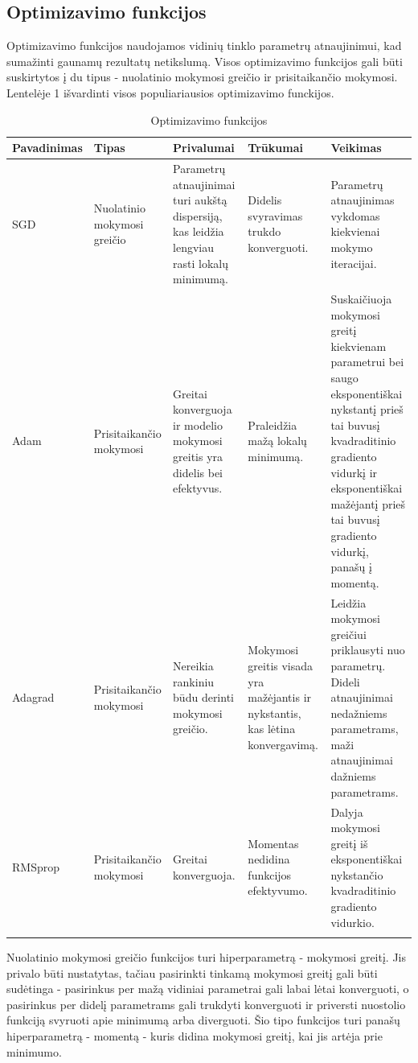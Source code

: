 \documentclass{VUMIFPSkursinis}
\begin{document}
\subsection{Optimizavimo funkcijos}
Optimizavimo funkcijos naudojamos vidinių tinklo parametrų atnaujinimui, kad sumažinti gaunamų rezultatų netikslumą. 
Visos optimizavimo funkcijos gali būti suskirtytos į du tipus - nuolatinio mokymosi greičio ir prisitaikančio mokymosi. 
Lentelėje 1 išvardinti visos populiariausios optimizavimo funckijos.

\begin{longtable}[h!]{ | p{2cm} | p{2.2cm} | p{2.5cm} | p{2.5cm} | p{4.5cm} | } 
\hline
Pavadinimas & Tipas & Privalumai & Trūkumai & Veikimas \\
\hline
SGD & Nuolatinio mokymosi greičio & Parametrų atnaujinimai turi aukštą dispersiją, kas leidžia lengviau rasti lokalų minimumą. & Didelis svyravimas trukdo konverguoti. & Parametrų atnaujinimas vykdomas kiekvienai mokymo iteracijai. \\
\hline
Adam & Prisitaikančio mokymosi & Greitai konverguoja ir modelio mokymosi greitis yra didelis bei efektyvus. & Praleidžia mažą lokalų minimumą. & Suskaičiuoja mokymosi greitį kiekvienam parametrui bei saugo eksponentiškai nykstantį prieš tai buvusį kvadraditinio gradiento vidurkį ir eksponentiškai mažėjantį prieš tai buvusį gradiento vidurkį, panašų į momentą. \\
\hline
Adagrad & Prisitaikančio mokymosi & Nereikia rankiniu būdu derinti mokymosi greičio. & Mokymosi greitis visada yra mažėjantis ir nykstantis, kas lėtina konvergavimą. & Leidžia mokymosi greičiui priklausyti nuo parametrų. Dideli atnaujinimai nedažniems parametrams, maži atnaujinimai dažniems parametrams. \\
\hline
RMSprop & Prisitaikančio mokymosi & Greitai konverguoja. & Momentas nedidina funkcijos efektyvumo. & Dalyja mokymosi greitį iš eksponentiškai nykstančio kvadraditinio gradiento vidurkio. \\
\hline
\caption{Optimizavimo funkcijos}
\end{longtable}

Nuolatinio mokymosi greičio funkcijos turi hiperparametrą - mokymosi greitį. Jis privalo būti nustatytas, tačiau 
pasirinkti tinkamą mokymosi greitį gali būti sudėtinga - pasirinkus per mažą vidiniai parametrai gali labai lėtai 
konverguoti, o pasirinkus per didelį parametrams gali trukdyti konverguoti ir priversti nuostolio funkciją svyruoti
apie minimumą arba diverguoti. Šio tipo funkcijos turi panašų hiperparametrą - momentą - kuris didina mokymosi greitį, 
kai jis artėja prie minimumo. 
\end{document}

